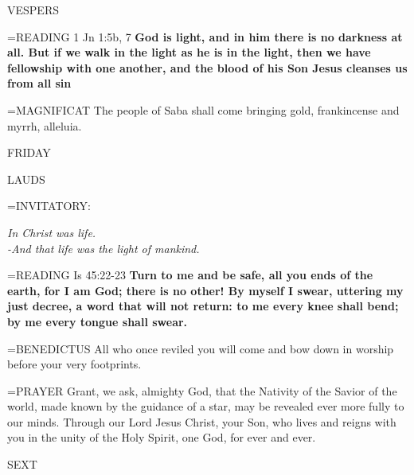 \begin{flushleft}\normalsize VESPERS\\\end{flushleft}

\hangindent=\parindent \small{READING}   1 Jn 1:5b, 7 \textbf{   God is light, and in him there is no darkness at all. But if we walk in the light as he is in the light, then we have fellowship with one another, and the blood of his Son Jesus cleanses us from all sin\\}

\hangindent=\parindent \small{MAGNIFICAT 	The people of Saba shall come bringing gold, frankincense and myrrh, alleluia.\\}

\begin{center}
\normalsize FRIDAY
\end{center}

\begin{flushleft}\normalsize LAUDS\\\end{flushleft}

\hangindent=\parindent \small{INVITATORY:}
\begin{center}
\textit{In Christ was life.\\}
\textit{-And that life was the light of mankind.\\}
\end{center}

\hangindent=\parindent \small{READING}   Is 45:22-23 \textbf{  Turn to me and be safe, all you ends of the earth, for I am God; there is no other! By myself I swear, uttering my just decree, a word that will not return: to me every knee shall bend; by me every tongue shall swear.\\}

\hangindent=\parindent \small{BENEDICTUS 	All who once reviled you will come and bow down in worship before your very footprints.\\}

\hangindent=\parindent \small{PRAYER 	Grant, we ask, almighty God, that the Nativity of the Savior of the world, made known by the guidance of a star, may be revealed ever more fully to our minds. Through our Lord Jesus Christ, your Son, who lives and reigns with you in the unity of the Holy Spirit, one God, for ever and ever.}

\begin{flushleft}\normalsize SEXT\\\end{flushleft}

